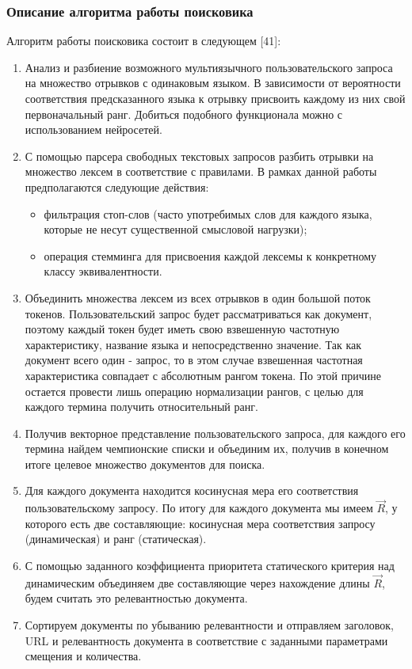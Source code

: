 \subsubsection{Описание алгоритма работы поисковика}
Алгоритм работы поисковика состоит в следующем [41]:
\begin{enumerate}
\item Анализ и разбиение возможного мультиязычного пользовательского запроса на множество отрывков с одинаковым языком. В зависимости от вероятности соответствия предсказанного языка к отрывку присвоить каждому из них свой первоначальный ранг. Добиться подобного функционала можно с использованием нейросетей.
\item С помощью парсера свободных текстовых запросов разбить отрывки на множество лексем в соответствие с правилами. В рамках данной работы предполагаются следующие действия:
\begin{itemize}
\item фильтрация стоп-слов (часто употребимых слов для каждого языка, которые не несут существенной смысловой нагрузки);
\item операция стемминга для присвоения каждой лексемы к конкретному классу эквивалентности.
\end{itemize}
\item Объединить множества лексем из всех отрывков в один большой поток токенов. Пользовательский запрос будет рассматриваться как документ, поэтому каждый токен будет иметь свою взвешенную частотную характеристику, название языка и непосредственно значение. Так как документ всего один - запрос, то в этом случае взвешенная частотная характеристика совпадает с абсолютным рангом токена. По этой причине остается провести лишь операцию нормализации рангов, с целью для каждого термина получить относительный ранг.
\item Получив векторное представление пользовательского запроса, для каждого его термина найдем чемпионские списки и объединим их, получив в конечном итоге целевое множество документов для поиска.
\item Для каждого документа находится косинусная мера его соответствия пользовательскому запросу. По итогу для каждого документа мы имеем $\vec{R}$, у которого есть две составляющие: косинусная мера соответствия запросу (динамическая) и ранг (статическая).
\item С помощью заданного коэффициента приоритета статического критерия над динамическим объединяем две составляющие через нахождение длины $\vec{R}$, будем считать это релевантностью документа.
\item Сортируем документы по убыванию релевантности и отправляем заголовок, URL и релевантность документа в соответствие с заданными параметрами смещения и количества.
\end{enumerate}

